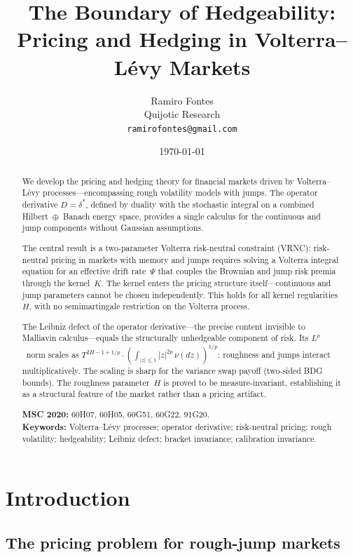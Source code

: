 \documentclass[11pt,a4paper]{article}
\title{The Boundary of Hedgeability:\\[0.3em]
Pricing and Hedging in Volterra--L\'evy Markets}
\author{Ramiro Fontes\\[0.5em]
\small Quijotic Research\\[0.3em]
\small\texttt{ramirofontes@gmail.com}}
\date{\today}
\theoremstyle{plain}
\theoremstyle{definition}
\theoremstyle{remark}
\begin{document}
\maketitle

\begin{abstract}
We develop the pricing and hedging theory for financial markets
driven by Volterra--L\'evy processes---encompassing rough
volatility models with jumps.  The operator derivative
$D = \delta^*$, defined by duality with the stochastic integral
on a combined Hilbert~$\oplus$~Banach energy space, provides a
single calculus for the continuous and jump components without
Gaussian assumptions.

The central result is a two-parameter Volterra risk-neutral
constraint (VRNC): risk-neutral pricing in markets with memory
and jumps requires solving a Volterra integral equation for an
effective drift rate~$\Psi$ that couples the Brownian and jump
risk premia through the kernel~$K$.  The kernel enters the
pricing structure itself---continuous and jump parameters
cannot be chosen independently.  This holds for all kernel
regularities~$H$, with no semimartingale restriction on the
Volterra process.

The Leibniz defect of the operator derivative---the precise
content invisible to Malliavin calculus---equals the
structurally unhedgeable component of risk.  Its $L^p$~norm
scales as
$T^{2H-1+1/p} \cdot (\int_{|z|\leq 1}|z|^{2p}\,\nu(dz))^{1/p}$:
roughness and jumps interact multiplicatively.  The scaling is
sharp for the variance swap payoff (two-sided BDG bounds).
The roughness parameter~$H$ is proved to be
measure-invariant, establishing it as a structural feature
of the market rather than a pricing artifact.

\medskip\noindent\textbf{MSC 2020:} 60H07, 60H05, 60G51,
60G22, 91G20.\\
\textbf{Keywords:} Volterra--L\'evy processes; operator
derivative; risk-neutral pricing; rough volatility; hedgeability;
Leibniz defect; bracket invariance; calibration invariance.
\end{abstract}


\section{Introduction}\label{sec:intro}

\subsection{The pricing problem for rough-jump markets}
\end{document}
